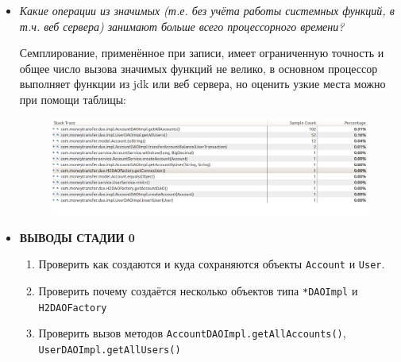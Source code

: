 \documentclass{article}
\begin{document}
\begin{itemize}
		\newpage
		\item \textit{Какие операции из значимых (т.е. без учёта работы системных функций, в т.ч. веб сервера) занимают больше всего процессорного времени?}

		Семплирование, применённое при записи, имеет ограниченную точность и общее число вызова значимых функций не велико, 
		в основном процессор выполняет функции из jdk или веб сервера, но оценить узкие места можно при помощи таблицы: 

		\begin{figure}[h!] %
			\centering
			\includegraphics[width=0.95\linewidth]{img/stage_0/hotmethods.png}
			\label{fig:hotmethods0}
		\end{figure}

		\item \textbf{ВЫВОДЫ СТАДИИ 0}
		\begin{enumerate}
			\item Проверить как создаются и куда сохраняются объекты \texttt{Account} и \texttt{User}.
			\item Проверить почему создаётся несколько объектов типа \texttt{*DAOImpl} и \texttt{H2DAOFactory}
			\item Проверить вызов методов \texttt{AccountDAOImpl.getAllAccounts()}, \texttt{UserDAOImpl.getAllUsers()}
		\end{enumerate}
	\end{itemize}
\end{document}
